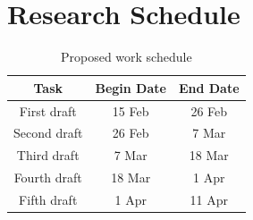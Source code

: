 \newpage
\vspace*{-.1in}
\section{Research Schedule}
\label{sec:schedule}
\vspace*{-.1in}


\begin{table}[htbp]
\centering
\begin{tabular}{|c||c|c|}
\hline
\bf Task & \bf Begin Date & \bf End Date\\\hline\hline
First draft & 15 Feb & 26 Feb\\\hline
Second draft & 26 Feb & 7 Mar\\\hline
Third draft & 7 Mar & 18 Mar \\\hline
Fourth draft & 18 Mar & 1 Apr \\\hline
Fifth draft & 1 Apr & 11 Apr\\\hline
\end{tabular}
\caption{Proposed work schedule}
\label{intro-tab3}
\end{table}

